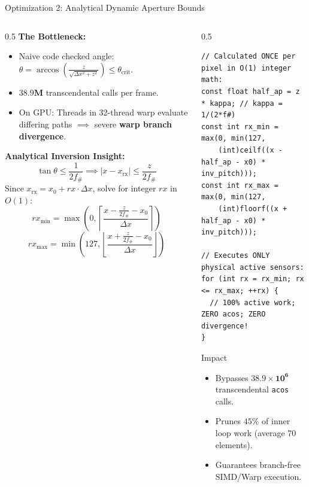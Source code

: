 \documentclass[aspectratio=169,10pt]{beamer}
\begin{document}
\begin{frame}[fragile]{Optimization 2: Analytical Dynamic Aperture Bounds}
  \begin{columns}[T]
    \begin{column}{0.5\textwidth}
      \textbf{\small The Bottleneck:}
      \scriptsize
      \begin{itemize}
        \item Naive code checked angle: $\theta = \arccos\left(\frac{z}{\sqrt{\Delta x^2 + z^2}}\right) \le \theta_{\text{crit}}$.
        \item $\mathbf{38.9\text{M}}$ transcendental calls per frame.
        \item On GPU: Threads in 32-thread warp evaluate differing paths $\implies$ severe \textbf{warp branch divergence}.
      \end{itemize}
      \textbf{\small Analytical Inversion Insight:}
      \scriptsize
      $$\tan \theta \le \frac{1}{2 f_{\#}} \implies |x - x_{\text{rx}}| \le \frac{z}{2 f_{\#}}$$
      Since $x_{\text{rx}} = x_0 + rx \cdot \Delta x$, solve for integer $rx$ in $O(1)$:
      $$rx_{\min} = \max\left(0, \left\lceil \frac{x - \frac{z}{2 f_{\#}} - x_0}{\Delta x} \right\rceil\right)$$
      $$rx_{\max} = \min\left(127, \left\lfloor \frac{x + \frac{z}{2 f_{\#}} - x_0}{\Delta x} \right\rfloor\right)$$
    \end{column}
    \begin{column}{0.5\textwidth}
\begin{lstlisting}[caption={O(1) Closed-Form Aperture Clamp}]
// Calculated ONCE per pixel in O(1) integer math:
const float half_ap = z * kappa; // kappa = 1/(2*f#)
const int rx_min = max(0, min(127, 
    (int)ceilf((x - half_ap - x0) * inv_pitch)));
const int rx_max = max(0, min(127, 
    (int)floorf((x + half_ap - x0) * inv_pitch)));

// Executes ONLY physical active sensors:
for (int rx = rx_min; rx <= rx_max; ++rx) {
  // 100% active work; ZERO acos; ZERO divergence!
}
\end{lstlisting}
      \begin{block}{Impact}
        \scriptsize
        \begin{itemize}
          \item Bypasses $\mathbf{38.9\times 10^6}$ transcendental \texttt{acos} calls.
          \item Prunes $45\%$ of inner loop work (average 70 elements).
          \item Guarantees branch-free SIMD/Warp execution.
        \end{itemize}
      \end{block}
    \end{column}
  \end{columns}
\end{frame}
\end{document}
